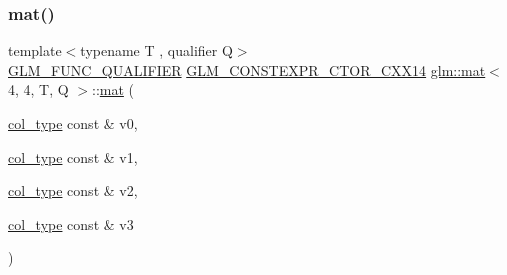 \subsubsection{\texorpdfstring{mat()}{mat()}\hspace{0.1cm}{\footnotesize\ttfamily [6/21]}}
{\footnotesize\ttfamily template$<$typename T , qualifier Q$>$ \\
\mbox{\hyperlink{setup_8hpp_a33fdea6f91c5f834105f7415e2a64407}{G\+L\+M\+\_\+\+F\+U\+N\+C\+\_\+\+Q\+U\+A\+L\+I\+F\+I\+ER}} \mbox{\hyperlink{setup_8hpp_a0900f9145e68bf6061b6f5e7be3fa751}{G\+L\+M\+\_\+\+C\+O\+N\+S\+T\+E\+X\+P\+R\+\_\+\+C\+T\+O\+R\+\_\+\+C\+X\+X14}} \mbox{\hyperlink{structglm_1_1mat}{glm\+::mat}}$<$ 4, 4, T, Q $>$\+::\mbox{\hyperlink{structglm_1_1mat}{mat}} (\begin{DoxyParamCaption}\item[{\mbox{\hyperlink{structglm_1_1mat_3_014_00_014_00_01_t_00_01_q_01_4_aad430dc291d0156d573c434be7fdecc1}{col\+\_\+type}} const \&}]{v0,  }\item[{\mbox{\hyperlink{structglm_1_1mat_3_014_00_014_00_01_t_00_01_q_01_4_aad430dc291d0156d573c434be7fdecc1}{col\+\_\+type}} const \&}]{v1,  }\item[{\mbox{\hyperlink{structglm_1_1mat_3_014_00_014_00_01_t_00_01_q_01_4_aad430dc291d0156d573c434be7fdecc1}{col\+\_\+type}} const \&}]{v2,  }\item[{\mbox{\hyperlink{structglm_1_1mat_3_014_00_014_00_01_t_00_01_q_01_4_aad430dc291d0156d573c434be7fdecc1}{col\+\_\+type}} const \&}]{v3 }\end{DoxyParamCaption})}

\mbox{\label{structglm_1_1mat_3_014_00_014_00_01_t_00_01_q_01_4_a17ec7d9bde054dde9908c44c56eccf95}} 
